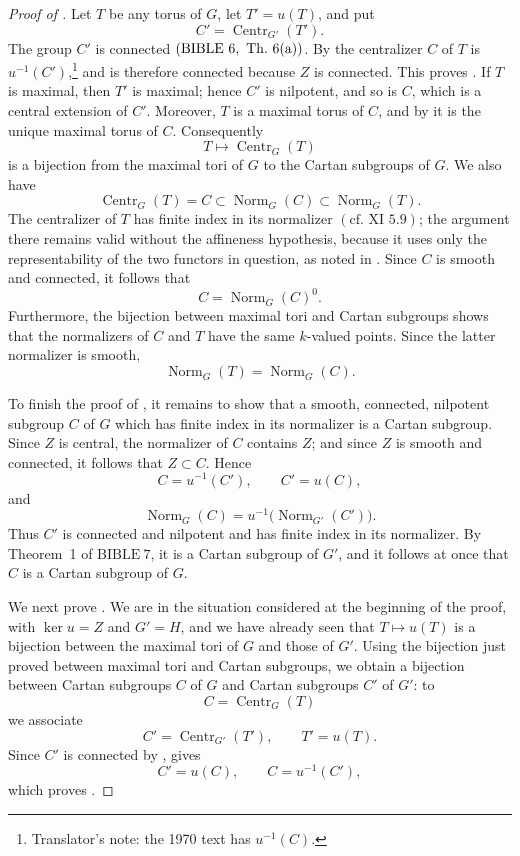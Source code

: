 \begin{proof}[Proof of ]
Let \(T\) be any torus of \(G\), let \(T'=u(T)\), and put
\[
  C'=\operatorname{Centr}_{G'}(T').
\]
The group \(C'\) is connected
\((\mathrm{BIBLE}\ 6,\ \mathrm{Th.}\ 6\textup{(a)})\).
By  the centralizer \(C\) of \(T\) is
\(u^{-1}(C')\),\footnote{Translator's note: the 1970 text has
\(u^{-1}(C)\).} and is therefore connected because \(Z\) is
connected. This proves \textup{}. If \(T\) is maximal, then
\(T'\) is maximal; hence \(C'\) is nilpotent, and so is \(C\),
which is a central extension of \(C'\). Moreover, \(T\) is a
maximal torus of \(C\), and by  it is the unique maximal torus
of \(C\). Consequently
\[
  T\longmapsto\operatorname{Centr}_G(T)
\]
is a bijection from the maximal tori of \(G\) to the Cartan
subgroups of \(G\). We also have
\[
  \operatorname{Centr}_G(T)=C
  \subset \operatorname{Norm}_G(C)
  \subset \operatorname{Norm}_G(T).
\]
The centralizer of \(T\) has finite index in its normalizer
\((\text{cf. XI~5.9})\); the argument there remains valid without
the affineness hypothesis, because it uses only the representability
of the two functors in question, as noted in . Since \(C\) is
smooth and connected, it follows that
\[
  C=\operatorname{Norm}_G(C)^{0}.
\]
Furthermore, the bijection between maximal tori and Cartan
subgroups shows that the normalizers of \(C\) and \(T\) have the
same \(k\)-valued points. Since the latter normalizer is smooth,
\[
  \operatorname{Norm}_G(T)=\operatorname{Norm}_G(C).
\]

To finish the proof of \textup{}, it remains to show that a
smooth, connected, nilpotent subgroup \(C\) of \(G\) which has
finite index in its normalizer is a Cartan subgroup. Since \(Z\) is
central, the normalizer of \(C\) contains \(Z\); and since \(Z\) is
smooth and connected, it follows that \(Z\subset C\). Hence
\[
  C=u^{-1}(C'),\qquad C'=u(C),
\]
and
\[
  \operatorname{Norm}_G(C)
  =u^{-1}\bigl(\operatorname{Norm}_{G'}(C')\bigr).
\]
Thus \(C'\) is connected and nilpotent and has finite index in its
normalizer. By Theorem~1 of \(\mathrm{BIBLE}\ 7\), it is a Cartan
subgroup of \(G'\), and it follows at once that \(C\) is a Cartan
subgroup of \(G\).

We next prove \textup{}. We are in the situation considered at
the beginning of the proof, with \(\ker u=Z\) and \(G'=H\), and we
have already seen that \(T\mapsto u(T)\) is a bijection between the
maximal tori of \(G\) and those of \(G'\). Using the bijection just
proved between maximal tori and Cartan subgroups, we obtain a
bijection between Cartan subgroups \(C\) of \(G\) and Cartan
subgroups \(C'\) of \(G'\): to
\[
  C=\operatorname{Centr}_G(T)
\]
we associate
\[
  C'=\operatorname{Centr}_{G'}(T'),
  \qquad T'=u(T).
\]
Since \(C'\) is connected by \textup{},  gives
\[
  C'=u(C),\qquad C=u^{-1}(C'),
\]
which proves \textup{}.


\end{proof}

